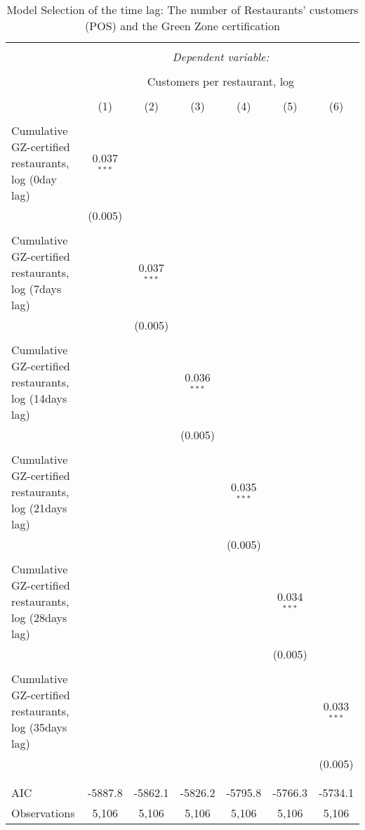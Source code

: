 
\begin{table}[!htbp] \centering 
  \caption{Model Selection of the time lag: The number of Restaurants' customers (POS) and the Green Zone certification} 
  \label{} 
\scriptsize 
\begin{tabular}{@{\extracolsep{1pt}}lcccccc} 
\\[-1.8ex]\hline 
\hline \\[-1.8ex] 
 & \multicolumn{6}{c}{\textit{Dependent variable:}} \\ 
\cline{2-7} 
\\[-1.8ex] & \multicolumn{6}{c}{Customers per restaurant, log} \\ 
\\[-1.8ex] & (1) & (2) & (3) & (4) & (5) & (6)\\ 
\hline \\[-1.8ex] 
 Cumulative GZ-certified restaurants, log (0day lag) & 0.037$^{***}$ &  &  &  &  &  \\ 
  & (0.005) &  &  &  &  &  \\ 
  & & & & & & \\ 
 Cumulative GZ-certified restaurants, log (7days lag) &  & 0.037$^{***}$ &  &  &  &  \\ 
  &  & (0.005) &  &  &  &  \\ 
  & & & & & & \\ 
 Cumulative GZ-certified restaurants, log (14days lag) &  &  & 0.036$^{***}$ &  &  &  \\ 
  &  &  & (0.005) &  &  &  \\ 
  & & & & & & \\ 
 Cumulative GZ-certified restaurants, log (21days lag) &  &  &  & 0.035$^{***}$ &  &  \\ 
  &  &  &  & (0.005) &  &  \\ 
  & & & & & & \\ 
 Cumulative GZ-certified restaurants, log (28days lag) &  &  &  &  & 0.034$^{***}$ &  \\ 
  &  &  &  &  & (0.005) &  \\ 
  & & & & & & \\ 
 Cumulative GZ-certified restaurants, log (35days lag) &  &  &  &  &  & 0.033$^{***}$ \\ 
  &  &  &  &  &  & (0.005) \\ 
  & & & & & & \\ 
\hline \\[-1.8ex] 
AIC & -5887.8 & -5862.1 & -5826.2 & -5795.8 & -5766.3 & -5734.1 \\ 
Observations & 5,106 & 5,106 & 5,106 & 5,106 & 5,106 & 5,106 \\ 

\end{tabular}
\end{table}

